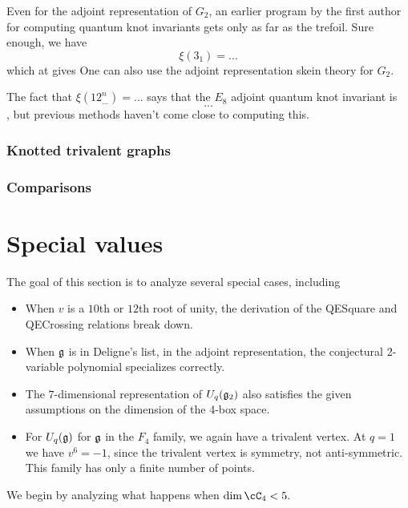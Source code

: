 \documentclass[12pt]{amsart}
\begin{document}
Even for the adjoint representation of $G_2$, an earlier program by the first
author for computing quantum knot invariants gets only as far as the trefoil. 
Sure enough, we have
$$\xi(3_1) = ...$$
which at  gives 
One can also use the adjoint representation skein theory for $G_2$.

The fact that $\xi(12^n_{...}) = ...$ says that the $E_8$ adjoint quantum 
knot invariant is $$...$$, but previous methods haven't come close to
computing this.

\subsubsection{Knotted trivalent graphs}\mbox{}%

\subsubsection{Comparisons}

\section{Special values}

The goal of this section is to analyze several special cases,
including
\begin{itemize}
\item When $v$ is a $10$th or $12$th root of unity, the
  derivation of the QESquare and QECrossing relations break down.
\item When ${\mathfrak g}$ is in Deligne's list, in the adjoint
  representation, the conjectural 2-variable polynomial specializes
  correctly.
\item The $7$-dimensional representation of $U_q({\mathfrak g}_2)$ also
  satisfies the given assumptions on the dimension of the 4-box space.
\item For $U_q({\mathfrak g})$ for ${\mathfrak g}$ in the $F_4$ family, we again have a
  trivalent vertex. At $q=1$ we have $v^6 = -1$, since the trivalent
  vertex is symmetry, not anti-symmetric. This family has only a
  finite number of points.
\end{itemize}
We begin by analyzing what happens when $\dim \cC_4 < 5.$
\end{document}
